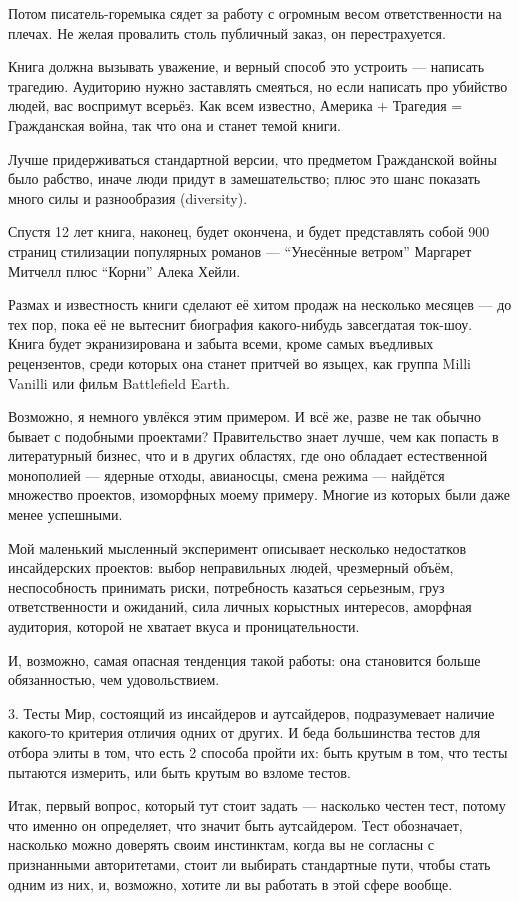 \documentclass[ebook,12pt,oneside,openany]{memoir}
\begin{document}
Потом писатель-горемыка сядет за работу с огромным весом
ответственности на плечах. Не желая провалить столь публичный заказ,
он перестрахуется.

Книга должна вызывать уважение, и верный способ это устроить —
написать трагедию. Аудиторию нужно заставлять смеяться, но если
написать про убийство людей, вас воспримут всерьёз. Как всем известно,
Америка + Трагедия = Гражданская война, так что она и станет темой
книги.

Лучше придерживаться стандартной версии, что предметом Гражданской
войны было рабство, иначе люди придут в замешательство; плюс это шанс
показать много силы и разнообразия (diversity).

Спустя 12 лет книга, наконец, будет окончена, и будет представлять
собой 900 страниц стилизации популярных романов — “Унесённые ветром”
Маргарет Митчелл плюс “Корни” Алека Хейли.

Размах и известность книги сделают её хитом продаж на несколько
месяцев — до тех пор, пока её не вытеснит биография какого-нибудь
завсегдатая ток-шоу. Книга будет экранизирована и забыта всеми, кроме
самых въедливых рецензентов, среди которых она станет притчей во
языцех, как группа Milli Vanilli или фильм Battlefield Earth.

Возможно, я немного увлёкся этим примером. И всё же, разве не так
обычно бывает с подобными проектами? Правительство знает лучше, чем
как попасть в литературный бизнес, что и в других областях, где оно
обладает естественной монополией — ядерные отходы, авианосцы, смена
режима — найдётся множество проектов, изоморфных моему примеру. Многие
из которых были даже менее успешными.

Мой маленький мысленный эксперимент описывает несколько недостатков
инсайдерских проектов: выбор неправильных людей, чрезмерный объём,
неспособность принимать риски, потребность казаться серьезным, груз
ответственности и ожиданий, сила личных корыстных интересов, аморфная
аудитория, которой не хватает вкуса и проницательности.

И, возможно, самая опасная тенденция такой работы: она становится
больше обязанностью, чем удовольствием.

3. Тесты Мир, состоящий из инсайдеров и аутсайдеров, подразумевает
наличие какого-то критерия отличия одних от других. И беда большинства
тестов для отбора элиты в том, что есть 2 способа пройти их: быть
крутым в том, что тесты пытаются измерить, или быть крутым во взломе
тестов.

Итак, первый вопрос, который тут стоит задать — насколько честен тест,
потому что именно он определяет, что значит быть аутсайдером. Тест
обозначает, насколько можно доверять своим инстинктам, когда вы не
согласны с признанными авторитетами, стоит ли выбирать стандартные
пути, чтобы стать одним из них, и, возможно, хотите ли вы работать в
этой сфере вообще.
\end{document}
